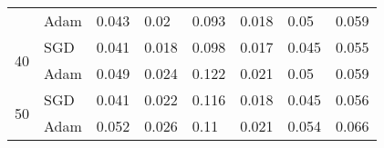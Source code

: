 \documentclass{article}
\begin{document}
\begin{table}
\begin{tabular}{cl|llllll}
                           & Adam                                    & 0.043                                     & 0.02                                      & 0.093                                     & 0.018                                     & 0.05                                      & 0.059                                      \\
\multirow{2}{*}{40}        & {\cellcolor[rgb]{0.788,0.788,0.788}}SGD & {\cellcolor[rgb]{0.788,0.788,0.788}}0.041 & {\cellcolor[rgb]{0.788,0.788,0.788}}0.018 & {\cellcolor[rgb]{0.788,0.788,0.788}}0.098 & {\cellcolor[rgb]{0.788,0.788,0.788}}0.017 & {\cellcolor[rgb]{0.788,0.788,0.788}}0.045 & {\cellcolor[rgb]{0.788,0.788,0.788}}0.055  \\
                           & Adam                                    & 0.049                                     & 0.024                                     & 0.122                                     & 0.021                                     & 0.05                                      & 0.059                                      \\
\multirow{2}{*}{50}        & {\cellcolor[rgb]{0.788,0.788,0.788}}SGD & {\cellcolor[rgb]{0.788,0.788,0.788}}0.041 & {\cellcolor[rgb]{0.788,0.788,0.788}}0.022 & {\cellcolor[rgb]{0.788,0.788,0.788}}0.116 & {\cellcolor[rgb]{0.788,0.788,0.788}}0.018 & {\cellcolor[rgb]{0.788,0.788,0.788}}0.045 & {\cellcolor[rgb]{0.788,0.788,0.788}}0.056  \\
                           & Adam                                    & 0.052                                     & 0.026                                     & 0.11                                      & 0.021                                     & 0.054                                     & 0.066                                      \\
\bottomrule
\end{tabular}
\end{table}
\end{document}
